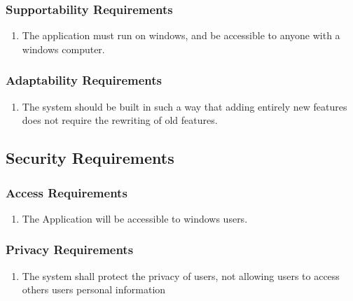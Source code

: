 \documentclass[english]{article}
\begin{document}
\subsubsection{Supportability Requirements}
\label{ssub:supportability_requirements}
\begin{enumerate}[{MSR}1. ]
\item The application must run on windows, and be accessible to anyone with a windows computer.

\end{enumerate}

\subsubsection{Adaptability Requirements}
\label{ssub:adaptability_requirements}
\begin{enumerate}[{MAR}1. ]
\item The system should be built in such a way that adding entirely new features does not require the rewriting of old features.

\end{enumerate}


\subsection{Security Requirements}
\label{sub:security_requirements}

\subsubsection{Access Requirements}
\label{ssub:access_requirements}
\begin{enumerate}[{SAR}1. ]
\item The Application will be accessible to windows users.


\end{enumerate}
\subsubsection{Privacy Requirements}
\label{ssub:privacy_requirements}
\begin{enumerate}[{SPR}1. ]
\item The system shall protect the privacy of users, not allowing users to access others users personal information
\end{enumerate}
\end{document}
